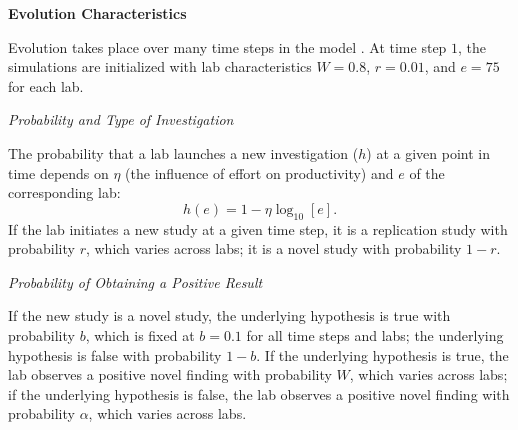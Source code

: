 \documentclass[meta, authordate]{jote-new-article}
\begin{document}
\begin{adjustwidth}{-4cm}{}
  \begin{tcolorbox}[
      enhanced,
      frame hidden,
      sharp corners,
      titlerule=0pt,
      colframe=joteOrangeLight,
      colbacktitle=joteOrangeLight,
      colback=joteOrangeLight,
      coltitle=jotedark,
      fontupper={\openreg \color{jotedark}},
      fonttitle={\overpass \bfseries \LARGE \color{jotedark}},
      top=\dimexpr\smallwidth,
      bottom=\dimexpr\smallwidth,
      title={\vskip-.7em%
          Box 1: Evolution in\\ \mbox{Smalidino and Mcelreath (2016)}%
          \vspace*{.2em}},
      before upper={\parindent10pt},
    ]

    \scriptsize{

      \noindent\textbf{Evolution Characteristics}
      \vspace*{\baselineskip}

      \noindent Evolution takes place over many time steps in the model \parencite[i.e., $100,000$ in Figure~$3$ and $1,000,000$ in Figures~$4$ and $5$ of][]{SmaldinoMcelreath2016}. At time step $1$, the simulations are initialized with lab characteristics $W=0.8$, $r=0.01$, and $e=75$ for each lab.

      \vspace*{\baselineskip}
      \noindent \emph{Probability and Type of Investigation}
      \vspace*{\baselineskip}

      \noindent The probability that a lab launches a new investigation ($h$) at a given point in time depends on $\eta$ (the influence of effort on productivity) and $e$ of the corresponding lab:
      \begin{equation}
        h\left(e\right)=1-\eta\log_{10}\left[e\right]\text{.}
      \end{equation}
      If the lab initiates a new study at a given time step, it is a replication study with probability $r$, which varies across labs; it is a novel study with probability $1-r$.

      \vspace*{\baselineskip}
      \noindent\emph{Probability of Obtaining a Positive Result}
      \vspace*{\baselineskip}

      \noindent If the new study is a novel study, the underlying hypothesis is true with probability $b$, which is fixed at $b=0.1$ for all time steps and labs; the underlying hypothesis is false with probability $1-b$. If the underlying hypothesis is true, the lab observes a positive novel finding with probability $W$, which varies across labs; if the underlying hypothesis is false, the lab observes a positive novel finding with probability $\alpha$, which varies across labs.

}
\end{tcolorbox}
\end{adjustwidth}
\end{document}
